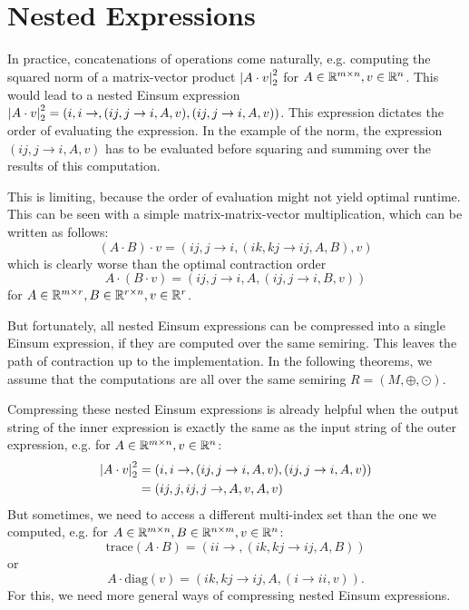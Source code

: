 \chapter{Nested Expressions}


In practice, concatenations of operations come naturally, e.g. computing the squared norm of a matrix-vector product $\left| A \cdot v \right|_2^2$
for $A \in \mathbb{R}^{m \times n}, v \in \mathbb{R}^n$.
This would lead to a nested Einsum expression $\left| A \cdot v \right|_2^2 = (i,i \rightarrow , (ij, j \rightarrow i, A, v), (ij, j \rightarrow i, A, v))$.
This expression dictates the order of evaluating the expression.
In the example of the norm, the expression $(ij, j \rightarrow i, A, v)$ has to be evaluated before squaring and summing over the results of this computation.

This is limiting, because the order of evaluation might not yield optimal runtime.
This can be seen with a simple matrix-matrix-vector multiplication, which can be written as follows:
$$(A \cdot B) \cdot v = (ij, j \rightarrow i, (ik, kj \rightarrow ij, A, B), v)$$
which is clearly worse than the optimal contraction order
$$A \cdot (B \cdot v) = (ij, j \rightarrow i, A, (ij, j \rightarrow i, B, v))$$
for $A \in \mathbb{R}^{m \times r}, B \in \mathbb{R}^{r \times n}, v \in \mathbb{R}^r$.

But fortunately, all nested Einsum expressions can be compressed into a single Einsum expression, if they are computed over the same semiring.
This leaves the path of contraction up to the implementation.
In the following theorems, we assume that the computations are all over the same semiring $R = (M, \oplus, \odot)$.



Compressing these nested Einsum expressions is already helpful when the output string of the inner expression is exactly the same as the input string of the outer expression,
e.g. for $A \in \mathbb{R}^{m \times n}, v \in \mathbb{R}^{n}$:
\begin{align*}
    \left| A \cdot v \right|_2^2 & = (i,i\rightarrow,(ij, j \rightarrow i, A, v),(ij, j \rightarrow i, A, v)) \\
                        & = (ij,j,ij,j\rightarrow,A,v,A,v)
\end{align*}
But sometimes, we need to access a different multi-index set than the one we computed, e.g. for $A \in \mathbb{R}^{m \times n}, B \in \mathbb{R}^{n \times m}, v \in \mathbb{R}^{n}$:
$$\text{trace}(A \cdot B) = (ii \rightarrow, (ik, kj \rightarrow ij, A, B))$$
or
$$A \cdot \text{diag}(v) = (ik, kj \rightarrow ij, A, (i \rightarrow ii, v)).$$
For this, we need more general ways of compressing nested Einsum expressions.

